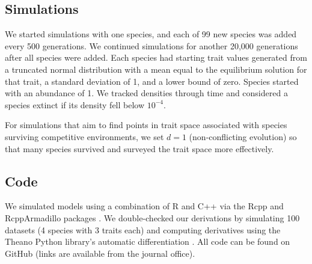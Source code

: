 \subsection*{Simulations}

We started simulations with one species, and each of 99 new species
was added every 500 generations.
We continued simulations for another 20,000 generations after all
species were added.
Each species had starting trait values generated from a truncated normal distribution 
with a mean equal to the equilibrium solution for that trait,
a standard deviation of 1, and a lower bound of zero.
Species started with an abundance of 1.
We tracked densities through time and considered a species extinct if its 
density fell below $10^{-4}$.



For simulations that aim to find points in trait space associated with
species surviving competitive environments, we set $d = 1$ 
(non-conflicting evolution) so that many species
survived and surveyed the trait space more effectively.





\subsection*{Code}

We simulated models using a combination of R \citep{RCoreTeam:2019wf} and
C++ via the Rcpp and RcppArmadillo packages
\citep{Eddelbuettel:2014ad,Eddelbuettel:2013if,Sanderson:2016cs}.
We double-checked our derivations by simulating 100 datasets
(4 species with 3 traits each) and computing derivatives using the Theano Python
library's automatic differentiation \citep{TheanoDevelopmentTeam:2016uc}.
All code can be found on GitHub
(links are available from the journal office).

